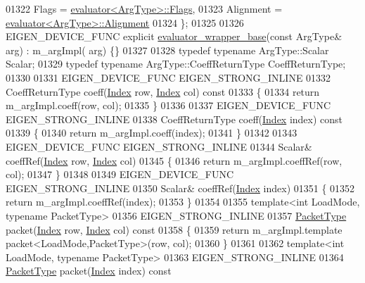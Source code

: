 \begin{DoxyCode}
01322     Flags = \hyperlink{struct_eigen_1_1internal_1_1evaluator}{evaluator<ArgType>::Flags},
01323     Alignment = \hyperlink{struct_eigen_1_1internal_1_1evaluator}{evaluator<ArgType>::Alignment}
01324   \};
01325 
01326   EIGEN\_DEVICE\_FUNC \textcolor{keyword}{explicit} \hyperlink{struct_eigen_1_1internal_1_1evaluator__wrapper__base}{evaluator\_wrapper\_base}(\textcolor{keyword}{const} ArgType& arg) : m\_argImpl(
      arg) \{\}
01327 
01328   \textcolor{keyword}{typedef} \textcolor{keyword}{typename} ArgType::Scalar Scalar;
01329   \textcolor{keyword}{typedef} \textcolor{keyword}{typename} ArgType::CoeffReturnType CoeffReturnType;
01330 
01331   EIGEN\_DEVICE\_FUNC EIGEN\_STRONG\_INLINE
01332   CoeffReturnType coeff(\hyperlink{namespace_eigen_a62e77e0933482dafde8fe197d9a2cfde}{Index} row, \hyperlink{namespace_eigen_a62e77e0933482dafde8fe197d9a2cfde}{Index} col)\textcolor{keyword}{ const}
01333 \textcolor{keyword}{  }\{
01334     \textcolor{keywordflow}{return} m\_argImpl.coeff(row, col);
01335   \}
01336 
01337   EIGEN\_DEVICE\_FUNC EIGEN\_STRONG\_INLINE
01338   CoeffReturnType coeff(\hyperlink{namespace_eigen_a62e77e0933482dafde8fe197d9a2cfde}{Index} index)\textcolor{keyword}{ const}
01339 \textcolor{keyword}{  }\{
01340     \textcolor{keywordflow}{return} m\_argImpl.coeff(index);
01341   \}
01342 
01343   EIGEN\_DEVICE\_FUNC EIGEN\_STRONG\_INLINE
01344   Scalar& coeffRef(\hyperlink{namespace_eigen_a62e77e0933482dafde8fe197d9a2cfde}{Index} row, \hyperlink{namespace_eigen_a62e77e0933482dafde8fe197d9a2cfde}{Index} col)
01345   \{
01346     \textcolor{keywordflow}{return} m\_argImpl.coeffRef(row, col);
01347   \}
01348 
01349   EIGEN\_DEVICE\_FUNC EIGEN\_STRONG\_INLINE
01350   Scalar& coeffRef(\hyperlink{namespace_eigen_a62e77e0933482dafde8fe197d9a2cfde}{Index} index)
01351   \{
01352     \textcolor{keywordflow}{return} m\_argImpl.coeffRef(index);
01353   \}
01354 
01355   \textcolor{keyword}{template}<\textcolor{keywordtype}{int} LoadMode, \textcolor{keyword}{typename} PacketType>
01356   EIGEN\_STRONG\_INLINE
01357   \hyperlink{struct_eigen_1_1_packet_type}{PacketType} packet(\hyperlink{namespace_eigen_a62e77e0933482dafde8fe197d9a2cfde}{Index} row, \hyperlink{namespace_eigen_a62e77e0933482dafde8fe197d9a2cfde}{Index} col)\textcolor{keyword}{ const}
01358 \textcolor{keyword}{  }\{
01359     \textcolor{keywordflow}{return} m\_argImpl.template packet<LoadMode,PacketType>(row, col);
01360   \}
01361 
01362   \textcolor{keyword}{template}<\textcolor{keywordtype}{int} LoadMode, \textcolor{keyword}{typename} PacketType>
01363   EIGEN\_STRONG\_INLINE
01364   \hyperlink{struct_eigen_1_1_packet_type}{PacketType} packet(\hyperlink{namespace_eigen_a62e77e0933482dafde8fe197d9a2cfde}{Index} index)\textcolor{keyword}{ const}

\end{DoxyCode}
